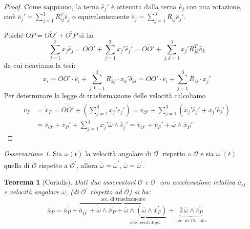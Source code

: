 \documentclass{book}
\theoremstyle{plain}
\newtheorem{teo}{Teorema}[chapter]
\theoremstyle{plain}
\theoremstyle{plain}
\theoremstyle{plain}
\theoremstyle{plain}
\theoremstyle{definition}
\theoremstyle{remark}
\newtheorem*{oss}{Osservazione}
\theoremstyle{definition}
\begin{document}
\begin{proof}
    Come sappiamo, la terna $\hat{e}_j'$ è ottenuta dalla terna $\hat{e}_j$ con una rotazione, cioè $\hat{e}_j'=\sum_{j=1}^3R_{ij}^T\hat{e}_j$ o equivalentemente $\hat{e}_j=\sum_{j=1}^3R_{ij}\hat{e}_j'$.

    \noindent Poiché $\overline{OP}=\overline{OO'}+\overline{O'P}$ si ha
    \begin{displaymath}
        \sum_{j=1}^3x_j\hat{e}_j=\overline{OO'}+\sum_{j=1}^3x_j'\hat{e}_j'=\overline{OO'}+\sum_{j,k=1}^3x_j'R_{jk}^T\hat{e}_k
    \end{displaymath}
    da cui ricaviamo la tesi:
    \begin{displaymath}
        x_i=\overline{OO'}\cdot\hat{e}_i+\sum_{j,k=1}^3R_{kj}\cdot x_k'\delta_{ki}=\overline{OO'}\cdot\hat{e}_i+\sum_{j=1}^3R_{ij}\cdot x_j'
    \end{displaymath}
    Per determinare la legge di trasformazione delle velocità calcoliamo
    \[
    \begin{split}
        \overline{v}_P&=\Dot{\overline{x}}_P=\Dot{\overline{OO'}}+ \Dot{\left(\sum_{j=1}^3x_j'{e}_j'\right)}=\overline{v}_{O'}+\sum_{j=1}^3\left(\Dot{x}_j'\hat{e}_j'+x_j'\Dot{\hat{e}}_j'\right) \\
        &=\overline{v}_{O'}+\overline{v}_P'+\sum_{j=1}^3x_j'\overline{\omega}\wedge\hat{e}_j'=\overline{v}_{O'}+\overline{v}_P'+\overline{\omega}\wedge\overline{x}_P'
    \end{split}
    \]
\end{proof}

\begin{oss}
    Sia $\overline{\omega}(t)$ la velocità angolare di $\mathcal{O}^{\prime}$ rispetto a $\mathcal{O}$ e sia $\overline{\omega}^{\prime}(t)$ quella di $\mathcal{O}$ rispetto a $\mathcal{O}^{\prime}$, allora $\dot{\overline{\omega}}=\dot{\overline{\omega}^{\prime}}$, $\overline{\omega}=\overline{\omega}^{\prime}$.
\end{oss}

\begin{teo}[Coriolis]
    Dati due osservatori $\mathcal{O}$ e $\mathcal{O}^{\prime}$ con accelerazione relativa $\overline{a}_{O^{\prime}}$ e velocità angolare $\overline{\omega}$, (di $\mathcal{O}^{\prime}$ rispetto ad $\mathcal{O}$) si ha:
    \begin{displaymath}
        \overline{a}_{P}=\overline{a}_{P}^{\prime}+\overbrace{\overline{a}_{O^{\prime}}+\dot{\overline{\omega}} \wedge \overline{x}_{P}^{\prime}+\underbrace{\overline{\omega} \wedge\left(\overline{\omega} \wedge \overline{x}_{P}^{\prime}\right)}_{\text{acc. centrifuga}}}^{\text{acc. di trascinamento}}+\underbrace{2\,\overline{\omega} \wedge \overline{v}_{P}^{\prime}}_{\text{acc. di Coriolis}}
    \end{displaymath}
\end{teo}
\end{document}
